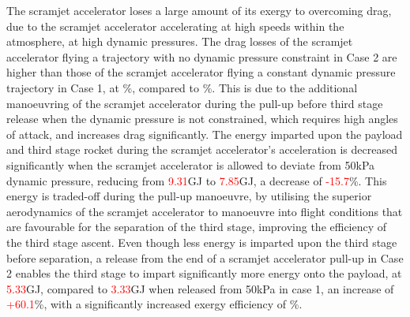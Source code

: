  
 The scramjet accelerator loses a large amount of its exergy to overcoming drag, due to the scramjet accelerator accelerating at high speeds within the atmosphere, at high dynamic pressures. 
 The drag losses of the scramjet accelerator flying a trajectory with no dynamic pressure constraint in Case 2 are higher than those of the scramjet accelerator flying a constant dynamic pressure trajectory in Case 1, at \WDsecondStandardNoReturn\%, compared to \WDsecondConstqNoReturn\%. This is due to the additional manoeuvring of the scramjet accelerator during the pull-up before third stage release when the dynamic pressure is not constrained, which requires high angles of attack, and increases drag significantly. 
The energy imparted upon the payload and third stage rocket during the scramjet accelerator's acceleration is decreased significantly when the scramjet accelerator is allowed to deviate from 50kPa dynamic pressure, reducing from \textcolor{red}{9.31}GJ to \textcolor{red}{7.85}GJ, a decrease of \textcolor{red}{-15.7}\%. This energy is traded-off during the pull-up manoeuvre, by utilising the superior aerodynamics of the scramjet accelerator to manoeuvre into flight conditions that are favourable for the separation of the third stage, improving the efficiency of the third stage ascent. Even though less energy is imparted upon the third stage before separation, a release from the end of a scramjet accelerator pull-up in Case 2 enables the third stage to impart significantly more energy onto the payload, at \textcolor{red}{5.33}GJ, compared to \textcolor{red}{3.33}GJ when released from 50kPa in case 1, an increase of \textcolor{red}{+60.1}\%, with a significantly increased exergy efficiency of \thirddExergyEffStandardNoReturn \%.  

